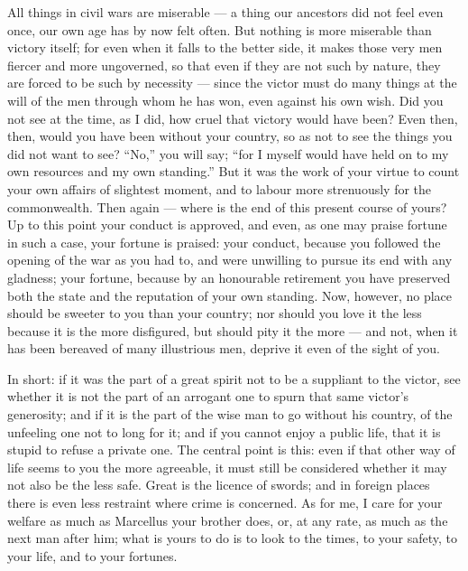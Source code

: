  All things in civil wars are miserable --- a thing our ancestors did not feel even once, our own age has by now felt often. But nothing is more miserable than victory itself; for even when it falls to the better side, it makes those very men fiercer and more ungoverned, so that even if they are not such by nature, they are forced to be such by necessity --- since the victor must do many things at the will of the men through whom he has won, even against his own wish. Did you not see at the time, as I did, how cruel that victory would have been? Even then, then, would you have been without your country, so as not to see the things you did not want to see? \enquote{No,} you will say; \enquote{for I myself would have held on to my own resources and my own standing.} But it was the work of your virtue to count your own affairs of slightest moment, and to labour more strenuously for the commonwealth. Then again --- where is the end of this present course of yours? Up to this point your conduct is approved, and even, as one may praise fortune in such a case, your fortune is praised: your conduct, because you followed the opening of the war as you had to, and were unwilling to pursue its end with any gladness; your fortune, because by an honourable retirement you have preserved both the state and the reputation of your own standing. Now, however, no place should be sweeter to you than your country; nor should you love it the less because it is the more disfigured, but should pity it the more --- and not, when it has been bereaved of many illustrious men, deprive it even of the sight of you.

 In short: if it was the part of a great spirit not to be a suppliant to the victor, see whether it is not the part of an arrogant one to spurn that same victor's generosity; and if it is the part of the wise man to go without his country, of the unfeeling one not to long for it; and if you cannot enjoy a public life, that it is stupid to refuse a private one. The central point is this: even if that other way of life seems to you the more agreeable, it must still be considered whether it may not also be the less safe. Great is the licence of swords; and in foreign places there is even less restraint where crime is concerned. As for me, I care for your welfare as much as Marcellus your brother does, or, at any rate, as much as the next man after him; what is yours to do is to look to the times, to your safety, to your life, and to your fortunes.

